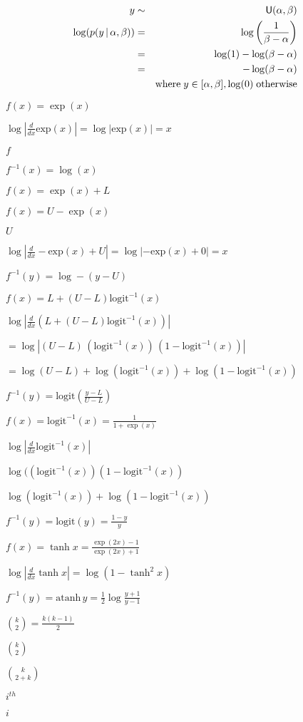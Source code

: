 \documentclass{article}
\begin{document}
\begin{eqnarray*} y &\sim& \mbox{\sf{U}}(\alpha, \beta) \\ \log (p (y \,|\, \alpha, \beta)) &=& \log \left( \frac{1}{\beta-\alpha} \right) \\ &=& \log (1) - \log (\beta - \alpha) \\ &=& -\log (\beta - \alpha) \\ & & \mathrm{ where } \; y \in [\alpha, \beta], \log(0) \; \mathrm{otherwise} \end{eqnarray*}
\pagebreak

$f(x) = \exp(x)$
\pagebreak

$\log | \frac{d}{dx} \mbox{exp}(x) | = \log | \mbox{exp}(x) | = x$
\pagebreak

$f$
\pagebreak

$f^{-1}(x) = \log(x)$
\pagebreak

$f(x) = \exp(x) + L$
\pagebreak

$f(x) = U - \exp(x)$
\pagebreak

$U$
\pagebreak

$ \log | \frac{d}{dx} -\mbox{exp}(x) + U | = \log | -\mbox{exp}(x) + 0 | = x$
\pagebreak

$f^{-1}(y) = \log -(y - U)$
\pagebreak

$f(x) = L + (U - L) \mbox{logit}^{-1}(x)$
\pagebreak

$\log \left| \frac{d}{dx} \left( L + (U-L) \mbox{logit}^{-1}(x) \right) \right|$
\pagebreak

$ {} = \log | (U-L) \, (\mbox{logit}^{-1}(x)) \, (1 - \mbox{logit}^{-1}(x)) |$
\pagebreak

$ {} = \log (U - L) + \log (\mbox{logit}^{-1}(x)) + \log (1 - \mbox{logit}^{-1}(x))$
\pagebreak

$f^{-1}(y) = \mbox{logit}(\frac{y - L}{U - L})$
\pagebreak

$f(x) = \mbox{logit}^{-1}(x) = \frac{1}{1 + \exp(x)}$
\pagebreak

$\log | \frac{d}{dx} \mbox{logit}^{-1}(x) |$
\pagebreak

$\log ((\mbox{logit}^{-1}(x)) (1 - \mbox{logit}^{-1}(x))$
\pagebreak

$\log (\mbox{logit}^{-1}(x)) + \log (1 - \mbox{logit}^{-1}(x))$
\pagebreak

$f^{-1}(y) = \mbox{logit}(y) = \frac{1 - y}{y}$
\pagebreak

$f(x) = \tanh x = \frac{\exp(2x) - 1}{\exp(2x) + 1}$
\pagebreak

$\log | \frac{d}{dx} \tanh x | = \log (1 - \tanh^2 x)$
\pagebreak

$ f^{-1}(y) = \mbox{atanh}\, y = \frac{1}{2} \log \frac{y + 1}{y - 1}$
\pagebreak

${k \choose 2} = \frac{k(k-1)}{2}$
\pagebreak

$k \choose 2$
\pagebreak

$k \choose 2 + k$
\pagebreak

$i^{th}$
\pagebreak

$i$
\pagebreak
\end{document}
